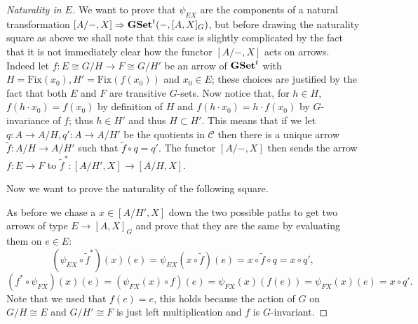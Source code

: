 \documentclass[italian, 12pt, reqno]{article}
\theoremstyle{myteo}
\numberwithin{equation}{section}
\newcommand{\cat}[1]{\mathscr{#1}}
\newcommand{\gset}{\text{\textbf{GSet}}}
\newcommand{\tgset}{\text{\textbf{GSet}}^t}
\newcommand{\fix}[1]{\text{Fix}(#1)}
\newcommand{\homs}[2]{[#1, #2]}
\newcommand{\fun}[3]{#1\colon#2\to #3}
\begin{document}
\begin{proof}[Naturality in \(E\)]
  \label{proof:naturality_in_E}
  We want to prove that \(\psi_{EX}\) are the components of a natural transformation \(\homs{A/-}{X}\Rightarrow\tgset(-, \homs{A}{X}_G)\), but before drawing the naturality square as above we shall note that this case is slightly complicated by the fact that it is not immediately clear how the functor \(\homs{A/-}{X}\) acts on arrows.
  Indeed let \(\fun{f}{E\cong G/H}{F\cong G/H'}\) be an arrow of \(\tgset\) with \(H = \fix{x_0}, H' = \fix{f(x_0)}\) and \(x_0\in E\); these choices are justified by the fact that both \(E\) and \(F\) are transitive \(G\)-sets.
  Now notice that, for \(h\in H\), \(f(h\cdot x_0) = f(x_0)\) by definition of \(H\) and \(f(h\cdot x_0) = h\cdot f(x_0)\) by \(G\)-invariance of \(f\); thus \(h\in H'\) and thus \(H\subset H'\).
  This means that if we let \(\fun{q}{A}{A/H}, \fun{q'}{A}{A/H'}\) be the quotients in \(\cat{C}\) then there is a unique arrow \(\fun{\widetilde{f}}{A/H}{A/H'}\) such that \(\widetilde{f}\circ q = q'\).
  The functor \(\homs{A/-}{X}\) then sends the arrow \(\fun{f}{E}{F}\) to \(\fun{\widetilde{f}^*}{\homs{A/H'}{X}}{\homs{A/H}{X}}\).

  Now we want to prove the naturality of the following square.
  \begin{center}
  \end{center}
  As before we chase a \(x\in\homs{A/H'}{X}\) down the two possible paths to get two arrows of type \(E\to\homs{A}{X}_G\) and prove that they are the same by evaluating them on \(e\in E\):
  \[(\psi_{EX}\circ \widetilde{f}^*)(x)(e) = \psi_{EX}(x\circ \widetilde{f})(e) = x\circ \widetilde{f}\circ q = x\circ q',\]
  \[(f^*\circ \psi_{FX})(x)(e) = (\psi_{FX}(x)\circ f)(e) = \psi_{FX}(x)(f(e)) = \psi_{FX}(x)(e) = x\circ q'.\]
  Note that we used that \(f(e) = e\), this holds because the action of \(G\) on \(G/H \cong E\) and \(G/H'\cong F\) is just left multiplication and \(f\) is \(G\)-invariant.
\end{proof}
\end{document}
